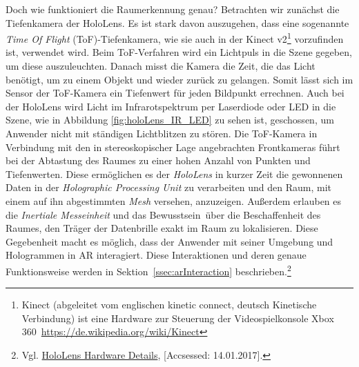 Doch wie funktioniert die Raumerkennung genau? Betrachten wir zunächst die Tiefenkamera der HoloLens. Es ist stark davon auszugehen, dass eine sogenannte \textit{Time Of Flight} (ToF)-Tiefenkamera, wie sie auch in der \frqq Kinect v2\flqq\footnote{ \glqq Kinect (abgeleitet vom englischen kinetic connect, deutsch Kinetische Verbindung) ist eine Hardware zur Steuerung der Videospielkonsole Xbox 360\grqq\ \url{https://de.wikipedia.org/wiki/Kinect}} vorzufinden ist, verwendet wird. Beim ToF-Verfahren wird ein Lichtpuls in die Szene gegeben, um diese auszuleuchten. Danach misst die Kamera die Zeit, die das Licht benötigt, um zu einem Objekt und wieder zurück zu gelangen. Somit lässt sich im Sensor der ToF-Kamera ein Tiefenwert für jeden Bildpunkt errechnen. Auch bei der HoloLens wird Licht im Infrarotspektrum per Laserdiode oder LED in die Szene, wie in Abbildung \ref{fig:holoLens_IR_LED} zu sehen ist, geschossen, um Anwender nicht mit ständigen Lichtblitzen zu stören. Die ToF-Kamera in Verbindung mit den in stereoskopischer Lage angebrachten Frontkameras führt bei der Abtastung des Raumes zu einer hohen Anzahl von Punkten und Tiefenwerten. Diese ermöglichen es der \textit{HoloLens} in kurzer Zeit die gewonnenen Daten in der \textit{Holographic Processing Unit} zu verarbeiten und den Raum, mit einem auf ihn abgestimmten \textit{Mesh} versehen, anzuzeigen. Außerdem erlauben es die \textit{Inertiale Messeinheit} und das \frqq Bewusstsein\flqq\ über die Beschaffenheit des Raumes, den Träger der Datenbrille exakt im Raum zu lokalisieren. Diese Gegebenheit macht es möglich, dass der Anwender mit seiner Umgebung und Hologrammen in AR interagiert. Diese Interaktionen und deren genaue Funktionsweise werden in Sektion~\ref{ssec:arInteraction} beschrieben.\footnote{ Vgl. \href{https://developer.microsoft.com/de-de/windows/holographic/hardware_details}{HoloLens Hardware Details}, [Accsessed: 14.01.2017].}
